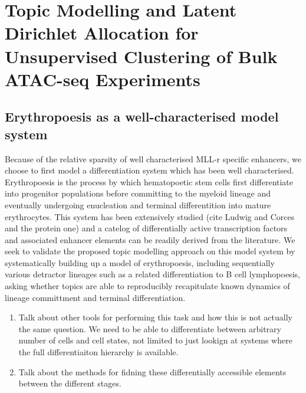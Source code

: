 

\chapter{\label{ch:1-intro} Topic Modelling and Latent Dirichlet Allocation for Unsupervised Clustering of Bulk ATAC-seq Experiments}

\minitoc

\providecommand{\tightlist}{%
  \setlength{\itemsep}{0pt}\setlength{\parskip}{0pt}}

\section{Erythropoesis as a well-characterised model system}

Because of the relative sparsity of well characterised MLL-r specific enhancers, we choose to first model a differentiation system which has been well characterised. Erythropoesis is the process by which hematopoetic stem cells first differentiate into progenitor populations before committing to the myeloid lineage and eventually undergoing enucleation and terminal differentition into mature erythrocytes. This system has been extensively studied (cite Ludwig and Corces and the protein one) and a catelog of differentially active transcription factors and associated enhancer elements can be readily derived from the literature. We seek to validate the proposed topic modelling approach on this model system by systematically building up a model of erythropoesis, including sequentially various detractor lineages such as a related differentiation to B cell lymphopoesis, asking whether topics are able to reproducibly recapitulate known dynamics of lineage committment and terminal differentiation. 


\begin{enumerate}
    \item Talk about other tools for performing this task and how this is not actually the same question. We need to be able to differentiate between arbitrary number of cells and cell states, not limited to just lookign at systems where the full differentiaiton hierarchy is available. 
    \item Talk about the methods for fidning these differentially accessible elements between the different stages. 
\end{enumerate}



